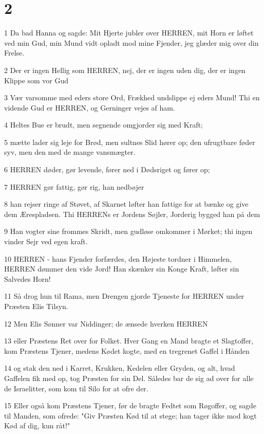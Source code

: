 \chapter{2}

\par 1 Da bad Hanna og sagde: Mit Hjerte jubler over HERREN, mit Horn er løftet ved min Gud, min Mund vidt opladt mod mine Fjender, jeg glæder mig over din Frelse.
\par 2 Der er ingen Hellig som HERREN, nej, der er ingen uden dig, der er ingen Klippe som vor Gud
\par 3 Vær varsomme med eders store Ord, Frækhed undslippe ej eders Mund! Thi en vidende Gud er HERREN, og Gerninger vejes af ham.
\par 4 Heltes Bue er brudt, men segnende omgjorder sig med Kraft;
\par 5 mætte lader sig leje for Brød, men sultnes Slid hører op; den ufrugtbare føder syv, men den med de mange vansmægter.
\par 6 HERREN døder, gør levende, fører ned i Dødsriget og fører op;
\par 7 HERREN gør fattig, gør rig, han nedbøjer
\par 8 han rejser ringe af Støvet, af Skarnet løfter han fattige for at bænke og give dem Ærespladsen. Thi HERRENs er Jordens Søjler, Jorderig bygged han på dem
\par 9 Han vogter sine frommes Skridt, men gudløse omkommer i Mørket; thi ingen vinder Sejr ved egen kraft.
\par 10 HERREN - hans Fjender forfærdes, den Højeste tordner i Himmelen, HERREN dømmer den vide Jord! Han skænker sin Konge Kraft, løfter sin Salvedes Horn!
\par 11 Så drog hun til Rama, men Drengen gjorde Tjeneste for HERREN under Præsten Elis Tilsyn.
\par 12 Men Elis Sønner var Niddinger; de ænsede hverken HERREN
\par 13 eller Præstens Ret over for Folket. Hver Gang en Mand bragte et Slagtoffer, kom Præstens Tjener, medens Kødet kogte, med en tregrenet Gaffel i Hånden
\par 14 og stak den ned i Karret, Krukken, Kedelen eller Gryden, og alt, hvad Gaffelen fik med op, tog Præsten for sin Del. Således bar de sig ad over for alle de Israelitter, som kom til Silo for at ofre der.
\par 15 Eller også kom Præstens Tjener, før de bragte Fedtet som Røgoffer, og sagde til Manden, som ofrede: "Giv Præsten Kød til at stege; han tager ikke mod kogt Kød af dig, kun råt!"
